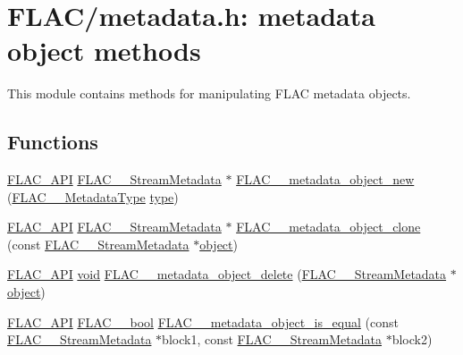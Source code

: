 \hypertarget{group__flac__metadata__object}{}\section{F\+L\+A\+C/metadata.h\+: metadata object methods}
\label{group__flac__metadata__object}


This module contains methods for manipulating F\+L\+AC metadata objects.  


\subsection*{Functions}
\begin{DoxyCompactItemize}
\item 
\mbox{\hyperlink{group__flac__export_ga56ca07df8a23310707732b1c0007d6f5}{F\+L\+A\+C\+\_\+\+A\+PI}} \mbox{\hyperlink{struct_f_l_a_c_____stream_metadata}{F\+L\+A\+C\+\_\+\+\_\+\+Stream\+Metadata}} $\ast$ \mbox{\hyperlink{group__flac__metadata__object_ga0d21a62648d8c5321b4b47f8ee5a52f0}{F\+L\+A\+C\+\_\+\+\_\+metadata\+\_\+object\+\_\+new}} (\mbox{\hyperlink{group__flac__format_gac71714ba8ddbbd66d26bb78a427fac01}{F\+L\+A\+C\+\_\+\+\_\+\+Metadata\+Type}} \mbox{\hyperlink{_s_d_l__opengl_8h_ad5ddf6fca7b585646515660e810e0188}{type}})
\item 
\mbox{\hyperlink{group__flac__export_ga56ca07df8a23310707732b1c0007d6f5}{F\+L\+A\+C\+\_\+\+A\+PI}} \mbox{\hyperlink{struct_f_l_a_c_____stream_metadata}{F\+L\+A\+C\+\_\+\+\_\+\+Stream\+Metadata}} $\ast$ \mbox{\hyperlink{group__flac__metadata__object_ga16b828b246e9af941e3e616e6bcd74c0}{F\+L\+A\+C\+\_\+\+\_\+metadata\+\_\+object\+\_\+clone}} (const \mbox{\hyperlink{struct_f_l_a_c_____stream_metadata}{F\+L\+A\+C\+\_\+\+\_\+\+Stream\+Metadata}} $\ast$\mbox{\hyperlink{_s_d_l__opengl__glext_8h_ab49790263c78300fbf05719e38246198}{object}})
\item 
\mbox{\hyperlink{group__flac__export_ga56ca07df8a23310707732b1c0007d6f5}{F\+L\+A\+C\+\_\+\+A\+PI}} \mbox{\hyperlink{_s_d_l__opengles2__gl2ext_8h_ae5d8fa23ad07c48bb609509eae494c95}{void}} \mbox{\hyperlink{group__flac__metadata__object_ga66bbe27dba68ba77be5af83986a280ea}{F\+L\+A\+C\+\_\+\+\_\+metadata\+\_\+object\+\_\+delete}} (\mbox{\hyperlink{struct_f_l_a_c_____stream_metadata}{F\+L\+A\+C\+\_\+\+\_\+\+Stream\+Metadata}} $\ast$\mbox{\hyperlink{_s_d_l__opengl__glext_8h_ab49790263c78300fbf05719e38246198}{object}})
\item 
\mbox{\hyperlink{group__flac__export_ga56ca07df8a23310707732b1c0007d6f5}{F\+L\+A\+C\+\_\+\+A\+PI}} \mbox{\hyperlink{ordinals_8h_a95103469f1cbd78b8cf250194985b34e}{F\+L\+A\+C\+\_\+\+\_\+bool}} \mbox{\hyperlink{group__flac__metadata__object_gac834137d4837c304ca5db4c8407900bb}{F\+L\+A\+C\+\_\+\+\_\+metadata\+\_\+object\+\_\+is\+\_\+equal}} (const \mbox{\hyperlink{struct_f_l_a_c_____stream_metadata}{F\+L\+A\+C\+\_\+\+\_\+\+Stream\+Metadata}} $\ast$block1, const \mbox{\hyperlink{struct_f_l_a_c_____stream_metadata}{F\+L\+A\+C\+\_\+\+\_\+\+Stream\+Metadata}} $\ast$block2)

\end{DoxyCompactItemize}
